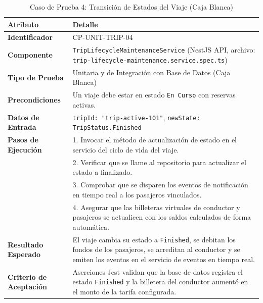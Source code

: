 \documentclass{article}
\begin{document}
\begin{table}[H]
\centering
\small
\caption{Caso de Prueba 4: Transición de Estados del Viaje (Caja Blanca)}
\begin{tabularx}{\linewidth}{p{4cm} X}
\toprule
\textbf{Atributo} & \textbf{Detalle} \\
\midrule
\textbf{Identificador} & CP-UNIT-TRIP-04 \\
\textbf{Componente} & \texttt{TripLifecycleMaintenanceService} (NestJS API, archivo: \texttt{trip-lifecycle-maintenance.service.spec.ts}) \\
\textbf{Tipo de Prueba} & Unitaria y de Integración con Base de Datos (Caja Blanca) \\
\textbf{Precondiciones} & Un viaje debe estar en estado \texttt{En Curso} con reservas activas. \\
\textbf{Datos de Entrada} & \texttt{tripId: "trip-active-101"}, \texttt{newState: TripStatus.Finished} \\
\textbf{Pasos de Ejecución} & 1. Invocar el método de actualización de estado en el servicio del ciclo de vida del viaje.\\
& 2. Verificar que se llame al repositorio para actualizar el estado a finalizado.\\
& 3. Comprobar que se disparen los eventos de notificación en tiempo real a los pasajeros vinculados.\\
& 4. Asegurar que las billeteras virtuales de conductor y pasajeros se actualicen con los saldos calculados de forma automática.\\
\textbf{Resultado Esperado} & El viaje cambia su estado a \texttt{Finished}, se debitan los fondos de los pasajeros, se acreditan al conductor y se emiten los eventos en el servicio de eventos en tiempo real. \\
\textbf{Criterio de Aceptación} & Aserciones Jest validan que la base de datos registra el estado \texttt{Finished} y la billetera del conductor aumentó en el monto de la tarifa configurada. \\
\bottomrule
\end{tabularx}
\end{table}
\end{document}
